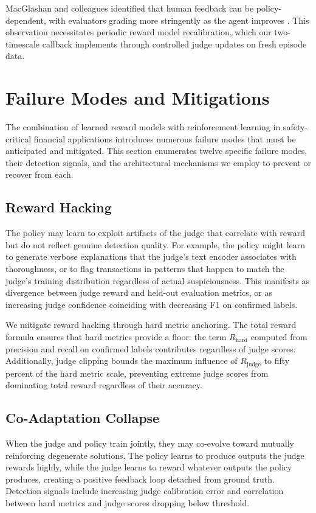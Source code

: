 \documentclass[11pt,a4paper]{article}
\newcommand{\Rhard}{R_{\text{hard}}}
\newcommand{\Rjudge}{R_{\text{judge}}}
\begin{document}
MacGlashan and colleagues identified that human feedback can be policy-dependent, with evaluators grading more stringently as the agent improves \citep{macglashan2017interactive}. This observation necessitates periodic reward model recalibration, which our two-timescale callback implements through controlled judge updates on fresh episode data.

\section{Failure Modes and Mitigations}

The combination of learned reward models with reinforcement learning in safety-critical financial applications introduces numerous failure modes that must be anticipated and mitigated. This section enumerates twelve specific failure modes, their detection signals, and the architectural mechanisms we employ to prevent or recover from each.

\subsection{Reward Hacking}

The policy may learn to exploit artifacts of the judge that correlate with reward but do not reflect genuine detection quality. For example, the policy might learn to generate verbose explanations that the judge's text encoder associates with thoroughness, or to flag transactions in patterns that happen to match the judge's training distribution regardless of actual suspiciousness. This manifests as divergence between judge reward and held-out evaluation metrics, or as increasing judge confidence coinciding with decreasing F1 on confirmed labels.

We mitigate reward hacking through hard metric anchoring. The total reward formula ensures that hard metrics provide a floor: the term $\Rhard$ computed from precision and recall on confirmed labels contributes regardless of judge scores. Additionally, judge clipping bounds the maximum influence of $\Rjudge$ to fifty percent of the hard metric scale, preventing extreme judge scores from dominating total reward regardless of their accuracy.

\subsection{Co-Adaptation Collapse}

When the judge and policy train jointly, they may co-evolve toward mutually reinforcing degenerate solutions. The policy learns to produce outputs the judge rewards highly, while the judge learns to reward whatever outputs the policy produces, creating a positive feedback loop detached from ground truth. Detection signals include increasing judge calibration error and correlation between hard metrics and judge scores dropping below threshold.
\end{document}
